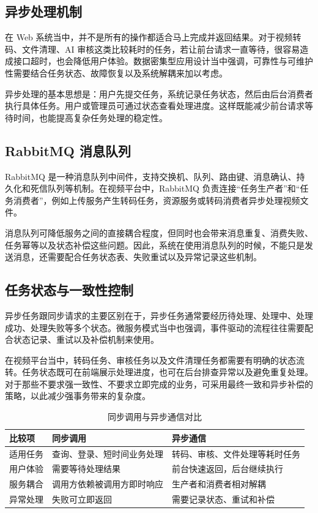 \subsection{异步处理机制}
\label{subsec:async-mechanism}

在 Web 系统当中，并不是所有的操作都适合马上完成并返回结果。对于视频转码、文件清理、AI 审核这类比较耗时的任务，若让前台请求一直等待，很容易造成接口超时，也会降低用户体验。数据密集型应用设计当中强调，可靠性与可维护性需要结合任务状态、故障恢复以及系统解耦来加以考虑\cite{kleppmann2017ddia}。

异步处理的基本思想是：用户先提交任务，系统记录任务状态，然后由后台消费者执行具体任务。用户或管理员可通过状态查看处理进度。这样既能减少前台请求等待时间，也能提高复杂任务处理的稳定性。

\subsection{RabbitMQ 消息队列}
\label{subsec:rabbitmq}

RabbitMQ 是一种消息队列中间件，支持交换机、队列、路由键、消息确认、持久化和死信队列等机制\cite{rabbitmqdocs}。在视频平台中，RabbitMQ 负责连接“任务生产者”和“任务消费者”，例如上传服务产生转码任务，资源服务或转码消费者异步处理视频文件。

消息队列可降低服务之间的直接耦合程度，但同时也会带来消息重复、消费失败、任务幂等以及状态补偿这些问题。因此，系统在使用消息队列的时候，不能只是发送消息，还需要配合任务状态表、失败重试以及异常记录这些机制。

\subsection{任务状态与一致性控制}
\label{subsec:task-status-consistency}

异步任务跟同步请求的主要区别在于，异步任务通常要经历待处理、处理中、处理成功、处理失败等多个状态。微服务模式当中也强调，事件驱动的流程往往需要配合状态记录、重试以及补偿机制来使用\cite{richardson2018microservices}。

在视频平台当中，转码任务、审核任务以及文件清理任务都需要有明确的状态流转。任务状态既可在前端展示处理进度，也可在后台排查异常以及避免重复处理。对于那些不要求强一致性、不要求立即完成的业务，可采用最终一致和异步补偿的策略，以此减少强事务带来的复杂度。

\begin{table}[htbp]
  \centering
  \caption{同步调用与异步通信对比}
  \label{tab:sync-async-summary-revised}
  \begin{tabular}{p{}p{}p{}}
    \hline
    \textbf{比较项} & \textbf{同步调用} & \textbf{异步通信} \\
    \hline
    适用任务 & 查询、登录、短时间业务处理 & 转码、审核、文件处理等耗时任务 \\
    用户体验 & 需要等待处理结果 & 前台快速返回，后台继续执行 \\
    服务耦合 & 调用方依赖被调用方即时响应 & 生产者和消费者相对解耦 \\
    异常处理 & 失败可立即返回 & 需要记录状态、重试和补偿 \\
    \hline
  \end{tabular}
\end{table}

